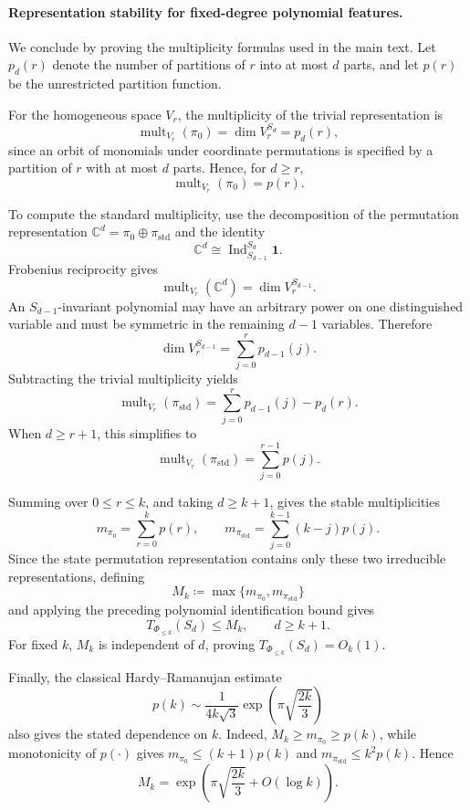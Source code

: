 \documentclass[11pt]{article}
\theoremstyle{plain}
\theoremstyle{definition}
\theoremstyle{remark}
\begin{document}
\paragraph{Representation stability for fixed-degree polynomial features.}
We conclude by proving the multiplicity formulas used in the main text.
Let \(p_d(r)\) denote the number of partitions of \(r\) into at most \(d\)
parts, and let \(p(r)\) be the unrestricted partition function.

For the homogeneous space \(V_r\), the multiplicity of the trivial
representation is
\[
\operatorname{mult}_{V_r}(\pi_0)
=
\dim V_r^{S_d}
=
p_d(r),
\]
since an orbit of monomials under coordinate permutations is specified by a
partition of \(r\) with at most \(d\) parts. Hence, for \(d\ge r\),
\[
\operatorname{mult}_{V_r}(\pi_0)=p(r).
\]

To compute the standard multiplicity, use the decomposition of the permutation
representation
\(\mathbb C^d=\pi_0\oplus\pi_{\mathrm{std}}\) and the identity
\[
\mathbb C^d
\cong
\operatorname{Ind}_{S_{d-1}}^{S_d}\mathbf 1.
\]
Frobenius reciprocity gives
\[
\operatorname{mult}_{V_r}(\mathbb C^d)
=
\dim V_r^{S_{d-1}}.
\]
An \(S_{d-1}\)-invariant polynomial may have an arbitrary power on one
distinguished variable and must be symmetric in the remaining \(d-1\)
variables. Therefore
\[
\dim V_r^{S_{d-1}}
=
\sum_{j=0}^r p_{d-1}(j).
\]
Subtracting the trivial multiplicity yields
\[
\operatorname{mult}_{V_r}(\pi_{\mathrm{std}})
=
\sum_{j=0}^r p_{d-1}(j)-p_d(r).
\]
When \(d\ge r+1\), this simplifies to
\[
\operatorname{mult}_{V_r}(\pi_{\mathrm{std}})
=
\sum_{j=0}^{r-1}p(j).
\]

Summing over \(0\le r\le k\), and taking \(d\ge k+1\), gives the stable
multiplicities
\[
m_{\pi_0}
=
\sum_{r=0}^k p(r),
\qquad
m_{\pi_{\mathrm{std}}}
=
\sum_{j=0}^{k-1}(k-j)p(j).
\]
Since the state permutation representation contains only these two irreducible
representations, defining
\[
M_k
\coloneqq
\max\{m_{\pi_0},m_{\pi_{\mathrm{std}}}\}
\]
and applying the preceding polynomial identification bound gives
\[
T_{\Phi_{\le k}}(S_d)\le M_k,
\qquad d\ge k+1.
\]
For fixed \(k\), \(M_k\) is independent of \(d\), proving
\(T_{\Phi_{\le k}}(S_d)=O_k(1)\).

Finally, the classical Hardy--Ramanujan estimate
\[
p(k)\sim
\frac{1}{4k\sqrt3}
\exp\left(\pi\sqrt{\frac{2k}{3}}\right)
\]
also gives the stated dependence on \(k\). Indeed,
\(M_k\ge m_{\pi_0}\ge p(k)\), while monotonicity of \(p(\cdot)\) gives
\(m_{\pi_0}\le(k+1)p(k)\) and
\(m_{\pi_{\mathrm{std}}}\le k^2p(k)\). Hence
\[
M_k
=
\exp\left(
\pi\sqrt{\frac{2k}{3}}+O(\log k)
\right).
\] 
\end{document}
